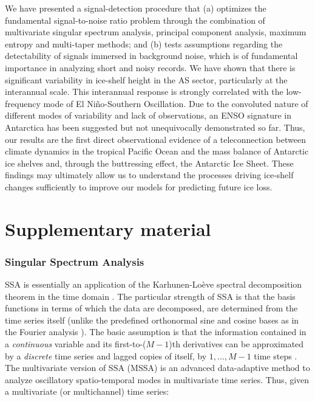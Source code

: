 We have presented a signal-detection procedure that (a) optimizes the fundamental signal-to-noise ratio problem through the combination of multivariate singular spectrum analysis, principal component analysis, maximum entropy and multi-taper methods; and (b) tests assumptions regarding the detectability of signals immersed in background noise, which is of fundamental importance in analyzing short and noisy records. We have shown that there is significant variability in ice-shelf height in the AS sector, particularly at the interannual scale. This interannual response is strongly correlated with the low-frequency mode of El Ni\~no-Southern Oscillation. Due to the convoluted nature of different modes of variability and lack of observations, an ENSO signature in Antarctica has been suggested but not unequivocally demonstrated so far. Thus, our results are the first direct observational evidence of a teleconnection between climate dynamics in the tropical Pacific Ocean and the mass balance of Antarctic ice shelves and, through the buttressing effect, the Antarctic Ice Sheet. These findings may ultimately allow us to understand the processes driving ice-shelf changes sufficiently to improve our models for predicting future ice loss.


\section{Supplementary material}

\subsubsection*{Singular Spectrum Analysis}

SSA is essentially an application of the Karhunen-Lo\`eve spectral decomposition theorem in the time domain \parencite[][, and references therein]{Ghil2002}. The particular strength of SSA is that the basis functions in terms of which the data are decomposed, are determined from the time series itself (unlike the predefined orthonormal sine and cosine bases as in the Fourier analysis \parencite{Blackman1958}). The basic assumption is that the information contained in a \emph{continuous} variable and its first-to-($M - 1$)th derivatives can be approximated by a \emph{discrete} time series and lagged copies of itself, by $1,...,M - 1$ time steps \parencite[][chap. 4]{Elsner1996}. The multivariate version of SSA (MSSA) is an advanced data-adaptive method to analyze oscillatory spatio-temporal modes in multivariate time series. Thus, given a multivariate (or multichannel) time series:

